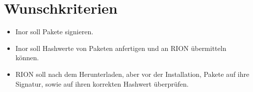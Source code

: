 \section{Wunschkriterien}
\begin{itemize}
	\item Inor soll Pakete signieren.
	\item Inor soll Hashwerte von Paketen anfertigen und an RION übermitteln können.
	\item RION soll nach dem Herunterladen, aber vor der Installation, Pakete auf ihre Signatur, sowie auf ihren korrekten Hashwert überprüfen.

\end{itemize}